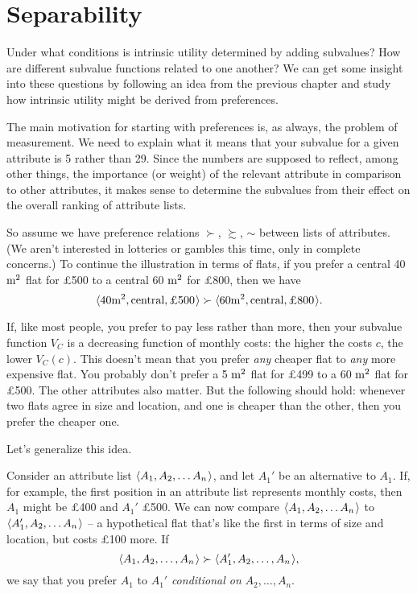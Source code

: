 \section{Separability}\label{sec:separability}

Under what conditions is intrinsic utility determined by adding subvalues? How are different
subvalue functions related to one another? We can get some insight into these
questions by following an idea from the previous chapter and study how intrinsic
utility might be derived from preferences.


The main motivation for starting with preferences is, as always, the problem of
measurement. We need to explain what it means that your subvalue for a given
attribute is 5 rather than 29. Since the numbers are supposed to reflect, among
other things, the importance (or weight) of the relevant attribute in comparison
to other attributes, it makes sense to determine the subvalues from their effect
on the overall ranking of attribute lists.

So assume we have preference relations $\succ$, $\succsim$, $\sim$ between lists
of attributes. (We aren't interested in lotteries or gambles this time, only in
complete concerns.) To continue the illustration in terms of flats, if you
prefer a central \mbox{40 $\text{m}^2$} flat for £500 to a central 60 $\text{m}^2$ for £800,
then we have
\[
 \t{40 \m^2, \text{central}, \text{£500}} \succ
 \t{60 \m^2, \text{central}, \text{£800}}.
\]

If, like most people, you prefer to pay less rather than more, then your
subvalue function $V_C$ is a decreasing function of monthly costs: the higher
the costs $c$, the lower $V_C(c)$. This doesn't mean that you prefer \emph{any}
cheaper flat to \emph{any} more expensive flat. You probably don't prefer a 5
$\text{m}^2$ flat for £499 to a 60 $\text{m}^2$ flat for £500. The other attributes also
matter. But the following should hold: whenever two flats agree in size and
location, and one is cheaper than the other, then you prefer the cheaper one.

Let's generalize this idea.

Consider an attribute list $\t{A_{1}, A_{2}, \ldots A_{n}}$, and let $A_{1}'$ be
an alternative to $A_{1}$. If, for example, the first position in an attribute
list represents monthly costs, then $A_{1}$ might be £400 and $A_{1}'$ £500. We
can now compare $\t{A_{1}, A_{2}, \ldots A_{n}}$ to
$\t{A_{1}', A_{2}, \ldots A_{n}}$ -- a hypothetical flat that's like the first
in terms of size and location, but costs £100 more. If
\[
   \t{A_1,A_2,\ldots,A_n} \succ \t{A_1',A_2,\ldots,A_n},
\]
we say that you prefer $A_1$ to $A_1'$ \emph{conditional on}
$A_{2},\ldots,A_{n}$.

